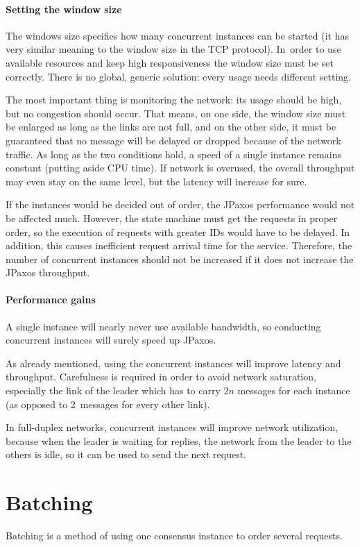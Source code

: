 \paragraph{Setting the window size}
The windows size specifies how many concurrent instances can be started (it has very similar meaning to the window size in the TCP protocol). In~order to use available resources and keep high responsiveness the window size must be set correctly. There is no global, generic solution: every usage needs different setting.

The most important thing is monitoring the network: its usage should be high, but no congestion should occur.
That means, on one side, the window size must be enlarged as long as the links are not full, and on the other side, it must be guaranteed that no message will be delayed or dropped because of the network traffic. As long as the two conditions hold, a speed of a single instance remains constant (putting aside CPU time).
If network is overused, the overall throughput may even stay on the same level, but the latency will increase for sure.

If the instances would be decided out of order, the JPaxos performance would not be affected much. However, the state machine must get the requests in proper order, so the execution of requests with greater IDs would have to be delayed. In addition, this causes inefficient request arrival time for the service. Therefore, the number of concurrent instances should not be increased if it does not increase the JPaxos throughput.

\paragraph{Performance gains}
A single instance will nearly never use available bandwidth, so conducting concurrent instances will surely speed up JPaxos.

As already mentioned, using the concurrent instances will improve latency and throughput. Carefulness is required in order to avoid network saturation, especially the link of the leader which has to carry $2n$ messages for each instance (as opposed to 2~messages for every other link).

In full-duplex networks, concurrent instances will improve network utilization, because when the leader is waiting for replies, the network from the leader to the others is idle, so it can be used to send the next request. 

\section{Batching}
\label{sec:batching}
Batching is a method of using one consensus instance to order several requests.

